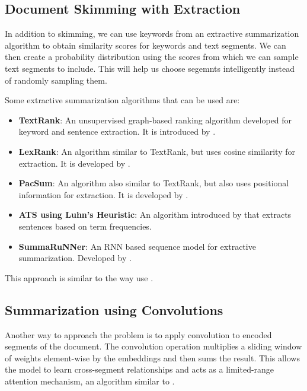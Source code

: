\subsection{Document Skimming with Extraction}

In addition to skimming, we can use keywords from an extractive summarization
algorithm to obtain similarity scores for keywords and text segments.
We can then create a probability distribution using the scores from which we can sample
text segments to include.
This will help us choose segemnts intelligently instead of randomly sampling them.

Some extractive summarization algorithms that can be used are:

\begin{itemize}
	\item \textbf{TextRank}: An unsupervised graph-based ranking algorithm developed for
	keyword and sentence extraction. It is introduced by
	\citet{mihalcea-tarau-2004-textrank}.
	\item \textbf{LexRank}: An algorithm similar to TextRank, but uses cosine similarity
	for extraction. It is developed by \citet{erkan2004lexrank}.
	\item \textbf{PacSum}: An algorithm also similar to TextRank, but also uses
	positional information for extraction. It is developed by
	\citet{zheng-lapata-2019-sentence}.
	\item \textbf{ATS using Luhn's Heuristic}: An algorithm introduced by
	\citet{10188527} that extracts sentences based on term frequencies.
	\item \textbf{SummaRuNNer}: An RNN based sequence model for extractive summarization.
	Developed by \citet{Nallapati_Zhai_Zhou_2017}.
\end{itemize}

This approach is similar to the way \citet{10.1145/3639233.3639253} use .


\subsection{Summarization using Convolutions}

Another way to approach the problem is to apply convolution to encoded segments of
the document.
The convolution operation multiplies a sliding window of weights element-wise by the
embeddings and then sums the result.
This allows the model to learn cross-segment relationships and acts as a
limited-range attention mechanism, an algorithm similar to \citet{chen2022long}.

